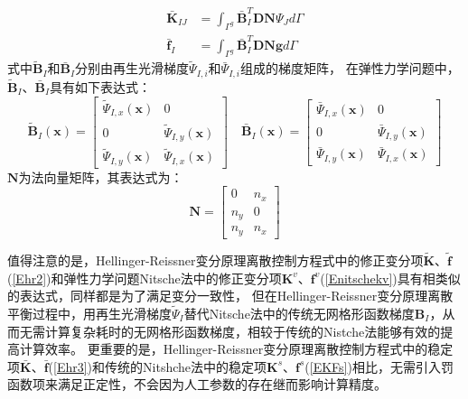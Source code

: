 \begin{subequations}\label{Ehr3}
\begin{align} 
    \bar{\pmb K}_{IJ}&=\int_{\Gamma^g}\bar{\pmb B}_I^T\pmb D\pmb N\Psi_Jd\Gamma\\
    \bar{\pmb f}_I&=\int_{\Gamma^g}\bar{\pmb B}_I^T\pmb D\pmb N \pmb{g}d\Gamma
\end{align}
\end{subequations}
式中$\tilde{\pmb B}_I$和$\bar{\pmb B}_I$分别由再生光滑梯度$\tilde{\Psi}_{I,i}$和$\bar{\Psi}_{I,i}$组成的梯度矩阵，
在弹性力学问题中，$\tilde{\pmb B}_I$、$\bar{\pmb B}_I$具有如下表达式：
\begin{equation}
    \tilde{\pmb{B}}_I(\pmb{x})= \begin{bmatrix}\tilde{\Psi}_{I,x}(\pmb{x})&0\\0&\tilde{\Psi}_{I,y}(\pmb{x})\\\tilde{\Psi}_{I,y}(\pmb{x})&\tilde{\Psi}_{I,x}(\pmb{x}) \end{bmatrix} 
    \quad
    \bar{\pmb{B}}_I(\pmb{x})= \begin{bmatrix}\bar{\Psi}_{I,x}(\pmb{x})&0\\0&\bar{\Psi}_{I,y}(\pmb{x})\\\bar{\Psi}_{I,y}(\pmb{x})&\bar{\Psi}_{I,x}(\pmb{x}) \end{bmatrix}
\end{equation}
$\pmb N$为法向量矩阵，其表达式为：
\begin{equation}
    \pmb{N}=\begin{bmatrix} 0&n_x\\n_y&0\\n_y&n_x
    \end{bmatrix}
\end{equation}\par
值得注意的是，Hellinger-Reissner变分原理离散控制方程式中的修正变分项$\tilde{\pmb K}$、$\tilde{\pmb f}$(\ref{Ehr2})和弹性力学问题Nitsche法中的修正变分项$\pmb K^v$、$\pmb f^v$(\ref{Enitschekv})具有相类似的表达式，同样都是为了满足变分一致性，
但在Hellinger-Reissner变分原理离散平衡过程中，用再生光滑梯度$\tilde{\Psi}_I$替代Nitsche法中的传统无网格形函数梯度$\pmb{B}_I$，从而无需计算复杂耗时的无网格形函数梯度，相较于传统的Nistche法能够有效的提高计算效率。
更重要的是，Hellinger-Reissner变分原理离散控制方程式中的稳定项$\bar{\pmb K}$、$\bar{\pmb f}$(\ref{Ehr3})和传统的Nitshche法中的稳定项$\pmb{K}^s$、$\pmb f^s$(\ref{EKFs})相比，无需引入罚函数项来满足正定性，不会因为人工参数的存在继而影响计算精度。
